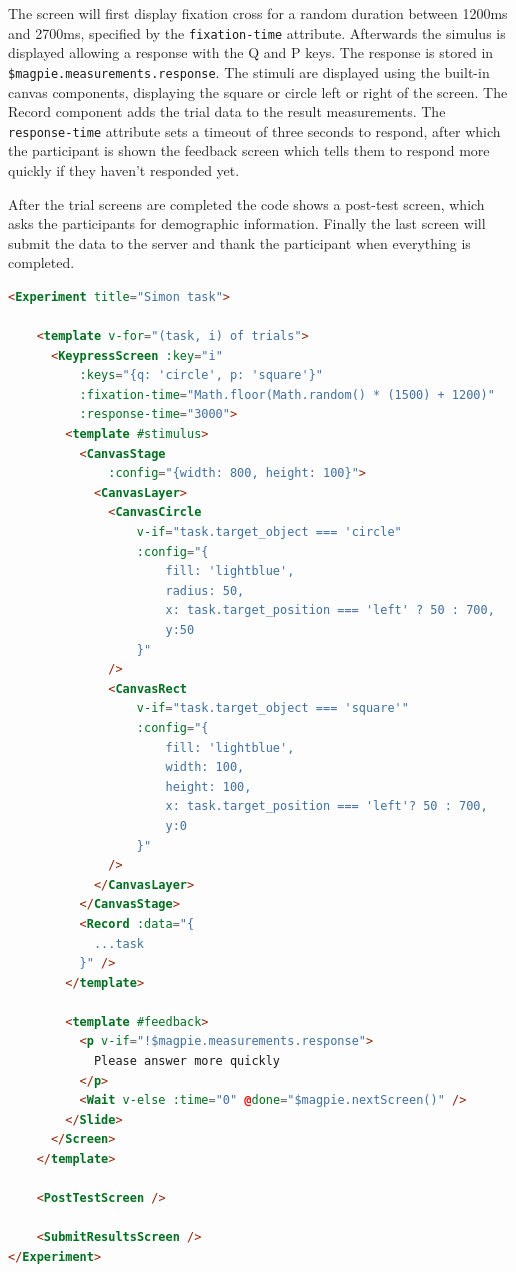 \documentclass[a4paper,10pt]{paper}
\begin{document}
The screen will first display fixation cross for a random duration between 1200ms and 2700ms, specified by the \texttt{fixation-time} attribute. Afterwards the simulus is displayed allowing a response with the Q and P keys. The response is stored in \texttt{\$magpie.measurements.response}. The stimuli are displayed using the built-in canvas components, displaying the square or circle left or right of the screen. The Record component adds the trial data to the result measurements. The \texttt{response-time} attribute sets a timeout of three seconds to respond, after which the participant is shown the feedback screen which tells them to respond more quickly if they haven't responded yet.

After the trial screens are completed the code shows a post-test screen, which asks the participants for demographic information. Finally the last screen will submit the data to the server and thank the participant when everything is completed.

\begin{lstlisting}[language=html]
<Experiment title="Simon task">

    <template v-for="(task, i) of trials">
      <KeypressScreen :key="i"
          :keys="{q: 'circle', p: 'square'}"
          :fixation-time="Math.floor(Math.random() * (1500) + 1200)"
          :response-time="3000">
        <template #stimulus>
          <CanvasStage
              :config="{width: 800, height: 100}">
            <CanvasLayer>
              <CanvasCircle
                  v-if="task.target_object === 'circle"
                  :config="{
                      fill: 'lightblue',
                      radius: 50,
                      x: task.target_position === 'left' ? 50 : 700,
                      y:50
                  }"
              />
              <CanvasRect
                  v-if="task.target_object === 'square'"
                  :config="{
                      fill: 'lightblue',
                      width: 100,
                      height: 100,
                      x: task.target_position === 'left'? 50 : 700,
                      y:0
                  }"
              />
            </CanvasLayer>
          </CanvasStage>
          <Record :data="{
            ...task
          }" />
        </template>

        <template #feedback>
          <p v-if="!$magpie.measurements.response">
          	Please answer more quickly
          </p>
          <Wait v-else :time="0" @done="$magpie.nextScreen()" />
        </Slide>
      </Screen>
    </template>

    <PostTestScreen />

    <SubmitResultsScreen />
</Experiment>
\end{lstlisting}
\end{document}

